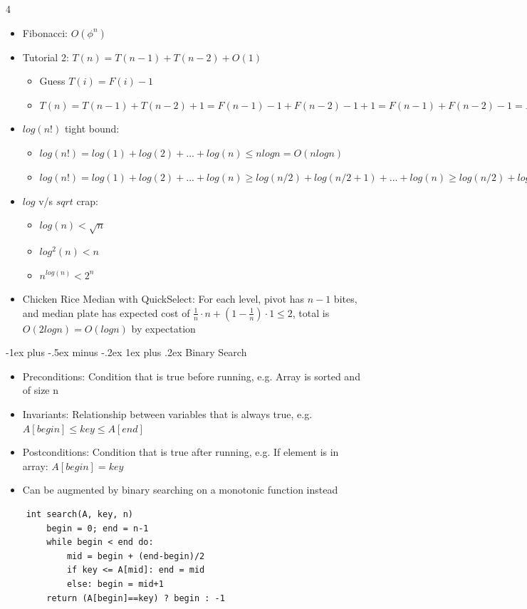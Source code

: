 \documentclass[10pt, landscape]{article}
\makeatletter
\renewcommand{\subsection}{\@startsection{subsection}{3}{0mm}%
                                {-1ex plus -.5ex minus -.2ex}%
                                {1ex plus .2ex}%
                                {\normalfont\small\bfseries}}%
\makeatother
\begin{document}
\begin{multicols*}{4}
\begin{itemize}
    \item Fibonacci: $O(\phi^n)$
    \item Tutorial 2: $T(n) = T(n-1) + T(n-2) + O(1)$
    \begin{itemize}
    \item Guess $T(i)=F(i)-1$
    \item $T(n) = T(n-1) + T(n-2) + 1 = F(n-1) -1 +F(n-2)-1+1=F(n-1)+F(n-2)-1=F(n)-1$
    \end{itemize}
    \item $log(n!)$ tight bound:
    \begin{itemize}
        \item $log(n!)=log(1)+log(2)+...+log(n)\leq nlogn=O(nlogn)$
    \item $log(n!)=log(1)+log(2)+...+log(n) \geq log(n/2)+log(n/2+1)+...+log(n) \geq log(n/2)+log(n/2)+...+log(n/2)=\frac{n}{2}log(\frac{n}{2})=\Omega(n log n))$
    \end{itemize}
    \item $log$ v/s $sqrt$ crap:
    \begin{itemize}
        \item $log(n) < \sqrt{n}$
        \item $log^2(n) < n$
        \item $n^{log(n)} < 2^n$
    \end{itemize}
    \item Chicken Rice Median with QuickSelect: For each level, pivot has $n-1$ bites, and median plate has expected cost of $\frac{1}{n}\cdot n+(1-\frac{1}{n}) \cdot 1 \leq 2$, total is $O(2logn)=O(logn)$ by expectation
\end{itemize}

\subsection{Binary Search}
\begin{itemize}
    \item Preconditions: Condition that is true before running, e.g. Array is sorted and of size n
    \item Invariants: Relationship between variables that is always true, e.g. $A[begin] \leq key \leq A[end]$
    \item Postconditions: Condition that is true after running, e.g. If element is in array: $A[begin] = key$
    \item Can be augmented by binary searching on a monotonic function instead
\end{itemize}
\begin{verbatim}
    int search(A, key, n)
        begin = 0; end = n-1
        while begin < end do:
            mid = begin + (end-begin)/2
            if key <= A[mid]: end = mid
            else: begin = mid+1
        return (A[begin]==key) ? begin : -1
\end{verbatim}


\end{multicols*}
\end{document}

